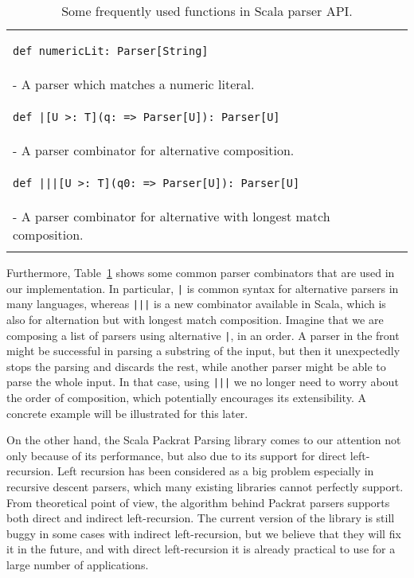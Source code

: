 \begin{table}[t]
\begin{tabular}{l}
\hline
\begin{lstlisting}
def numericLit: Parser[String]
\end{lstlisting} \\
\hspace{.2in}- A parser which matches a numeric literal. \\
\hline
\begin{lstlisting}
def |[U >: T](q: => Parser[U]): Parser[U]
\end{lstlisting} \\
\hspace{.2in}- A parser combinator for alternative composition. \\
\hline
\begin{lstlisting}
def |||[U >: T](q0: => Parser[U]): Parser[U]
\end{lstlisting} \\
\hspace{.2in}- A parser combinator for alternative with longest match composition. \\
\hline \\
\end{tabular}
\caption{Some frequently used functions in Scala parser API.}\label{tab1}
\end{table}

Furthermore, Table~\ref{tab1} shows some common parser combinators that are used in our implementation.
In particular, \lstinline{|} is common syntax for alternative parsers in many languages, whereas \lstinline{|||} is a new combinator available in Scala, which is also for alternation but with longest match composition. Imagine that we are composing a list of parsers using alternative \lstinline{|}, in an order. A parser in the front might be successful in parsing a substring of the input, but then it unexpectedly stops the parsing and discards the rest, while another parser might be able to parse the whole input. In that case, using \lstinline{|||} we no longer need to worry about the order of composition, which potentially encourages its extensibility. A concrete example will be illustrated for this later.

On the other hand, the Scala Packrat Parsing library comes to our attention not only because of its performance, but also due to its support for direct left-recursion. Left recursion has been considered as a big problem especially in recursive descent parsers, which many existing libraries cannot perfectly support. From theoretical point of view, the algorithm behind Packrat parsers supports both direct and indirect left-recursion. The current version of the library is still buggy in some cases with indirect left-recursion, but we believe that they will fix it in the future, and with direct left-recursion it is already practical to use for a large number of applications.

